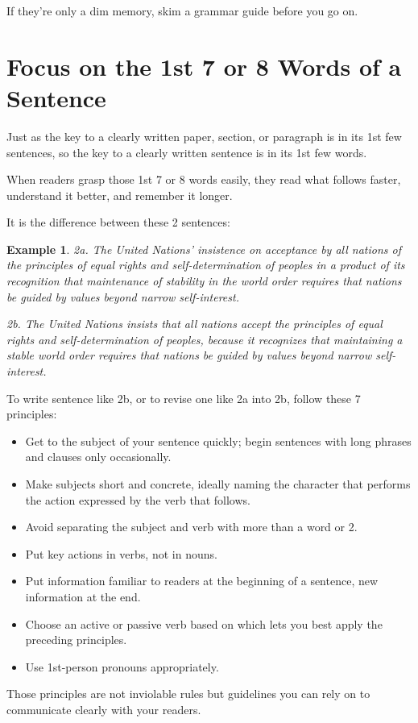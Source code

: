 \documentclass[oneside]{book}
\numberwithin{equation}{section}
\newtheorem{example}{Example}[section]
\begin{document}
If they're only a dim memory, skim a grammar guide before you go on.

\section{Focus on the 1st 7 or 8 Words of a Sentence}
Just as the key to a clearly written paper, section, or paragraph is in its 1st few sentences, so the key to a clearly written sentence is in its 1st few words.

When readers grasp those 1st 7 or 8 words easily, they read what follows faster, understand it better, and remember it longer.

It is the difference between these 2 sentences:
\begin{example}
    2a. The United Nations' insistence on acceptance by all nations of the principles of equal rights and self-determination of peoples in a product of its recognition that maintenance of stability in the world order requires that nations be guided by values beyond narrow self-interest.
    
    2b. The United Nations insists that all nations accept the principles of equal rights and self-determination of peoples, because it recognizes that maintaining a stable world order requires that nations be guided by values beyond narrow self-interest.
\end{example}
To write sentence like 2b, or to revise one like 2a into 2b, follow these 7 principles:
\begin{itemize}
    \item Get to the subject of your sentence quickly; begin sentences with long phrases and clauses only occasionally.
    \item Make subjects short and concrete, ideally naming the character that performs the action expressed by the verb that follows.
    \item Avoid separating the subject and verb with more than a word or 2.
    \item Put key actions in verbs, not in nouns.
    \item Put information familiar to readers at the beginning of a sentence, new information at the end.
    \item Choose an active or passive verb based on which lets you best apply the preceding principles.
    \item Use 1st-person pronouns appropriately.
\end{itemize}
Those principles are not inviolable rules but guidelines you can rely on to communicate clearly with your readers.
\end{document}
